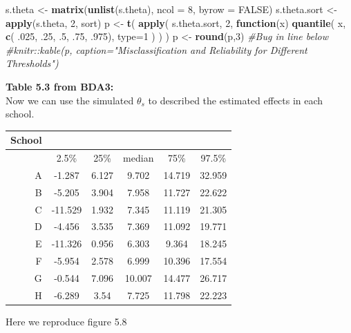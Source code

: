 \documentclass[]{article}
\newenvironment{Shaded}{\begin{snugshade}}{\end{snugshade}}
\newcommand{\KeywordTok}[1]{\textcolor[rgb]{0.13,0.29,0.53}{\textbf{#1}}}
\newcommand{\DataTypeTok}[1]{\textcolor[rgb]{0.13,0.29,0.53}{#1}}
\newcommand{\DecValTok}[1]{\textcolor[rgb]{0.00,0.00,0.81}{#1}}
\newcommand{\StringTok}[1]{\textcolor[rgb]{0.31,0.60,0.02}{#1}}
\newcommand{\CommentTok}[1]{\textcolor[rgb]{0.56,0.35,0.01}{\textit{#1}}}
\newcommand{\OtherTok}[1]{\textcolor[rgb]{0.56,0.35,0.01}{#1}}
\newcommand{\ControlFlowTok}[1]{\textcolor[rgb]{0.13,0.29,0.53}{\textbf{#1}}}
\newcommand{\NormalTok}[1]{#1}
\begin{document}
\begin{Shaded}
\begin{Highlighting}[]
\NormalTok{s.theta         <-}\StringTok{ }\KeywordTok{matrix}\NormalTok{(}\KeywordTok{unlist}\NormalTok{(s.theta), }\DataTypeTok{ncol =} \DecValTok{8}\NormalTok{, }\DataTypeTok{byrow =} \OtherTok{FALSE}\NormalTok{)}
\NormalTok{s.theta.sort    <-}\StringTok{ }\KeywordTok{apply}\NormalTok{(s.theta, }\DecValTok{2}\NormalTok{, sort)}
\NormalTok{p               <-}\StringTok{ }\KeywordTok{t}\NormalTok{( }\KeywordTok{apply}\NormalTok{( s.theta.sort, }\DecValTok{2}\NormalTok{, }\ControlFlowTok{function}\NormalTok{(x) }
            \KeywordTok{quantile}\NormalTok{( x, }\KeywordTok{c}\NormalTok{( .}\DecValTok{025}\NormalTok{, .}\DecValTok{25}\NormalTok{, .}\DecValTok{5}\NormalTok{, .}\DecValTok{75}\NormalTok{, .}\DecValTok{975}\NormalTok{), }\DataTypeTok{type=}\DecValTok{1}\NormalTok{ ) ) )}
\NormalTok{p               <-}\StringTok{ }\KeywordTok{round}\NormalTok{(p,}\DecValTok{3}\NormalTok{)}
\CommentTok{#Bug in line below}
\CommentTok{#knitr::kable(p, caption="Misclassification and Reliability for Different Thresholds")}
\end{Highlighting}
\end{Shaded}

\textbf{Table 5.3 from BDA3: }\\
Now we can use the simulated \(\theta_s\) to described the estimated
effects in each school.

\begin{longtable}[]{@{}rccccc@{}}
\toprule
School & & & & &\tabularnewline
\midrule
\endhead
& 2.5\% & 25\% & median & 75\% & 97.5\%\tabularnewline
A & -1.287 & 6.127 & 9.702 & 14.719 & 32.959\tabularnewline
B & -5.205 & 3.904 & 7.958 & 11.727 & 22.622\tabularnewline
C & -11.529 & 1.932 & 7.345 & 11.119 & 21.305\tabularnewline
D & -4.456 & 3.535 & 7.369 & 11.092 & 19.771\tabularnewline
E & -11.326 & 0.956 & 6.303 & 9.364 & 18.245\tabularnewline
F & -5.954 & 2.578 & 6.999 & 10.396 & 17.554\tabularnewline
G & -0.544 & 7.096 & 10.007 & 14.477 & 26.717\tabularnewline
H & -6.289 & 3.54 & 7.725 & 11.798 & 22.223\tabularnewline
\bottomrule
\end{longtable}

Here we reproduce figure 5.8
\end{document}
